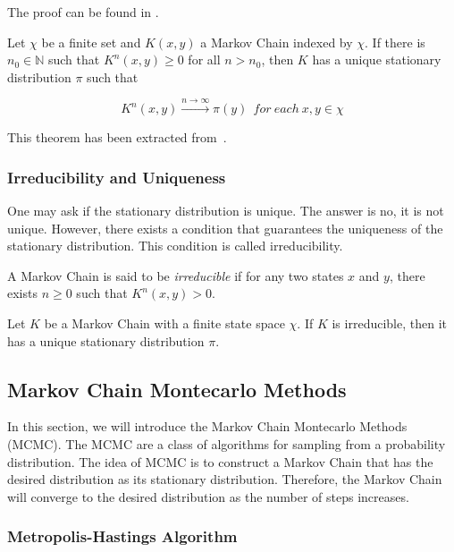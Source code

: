 \documentclass{article}
\begin{document}
The proof can be found in \cite{diaconis2008markov}.

\begin{theorem}
	Let \(\chi\) be a finite set and \(K(x,y)\) a Markov Chain indexed by $\chi$. If there is $n_0 \in \mathbb{N}$ such that \(K^n(x,y) \geq 0\) for all \(n > n_0\), then $K$ has a unique stationary distribution $\pi$ such that

	\[
		K^n(x,y) \xrightarrow{n \to \infty} \pi(y) \  \ for \ each \ x, y \in \chi
	\]
\end{theorem}

This theorem has been extracted from~\cite{reygner2023methodes}. 

\subsubsection{Irreducibility and Uniqueness}

One may ask if the stationary distribution is unique. The answer is no, it is not unique. However, there exists a condition that guarantees the uniqueness of the stationary distribution. This condition is called irreducibility. 

\begin{definition}
	A Markov Chain is said to be \textit{irreducible} if for any two states $x$ and $y$, there exists $n \geq 0$ such that $K^n(x,y) > 0$.
\end{definition}

\begin{proposition}
	Let $K$ be a Markov Chain with a finite state space $\chi$. If $K$ is irreducible, then it has a unique stationary distribution $\pi$.
\end{proposition}

\subsection{Markov Chain Montecarlo Methods}

In this section, we will introduce the Markov Chain Montecarlo Methods (MCMC). The MCMC are a class of algorithms for sampling from a probability distribution. The idea of MCMC is to construct a Markov Chain that has the desired distribution as its stationary distribution. Therefore, the Markov Chain will converge to the desired distribution as the number of steps increases.

\subsubsection{Metropolis-Hastings Algorithm}
\end{document}
